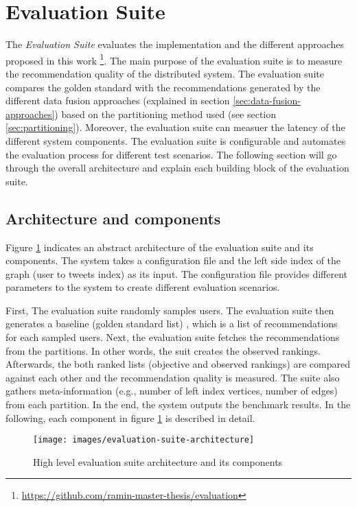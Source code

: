 \section{Evaluation Suite}
\label{sec:evaluation-suite}
The \emph{Evaluation Suite} evaluates the implementation and the different approaches proposed in this work \footnote{\url{https://github.com/ramin-master-thesis/evaluation}}. The main purpose of the evaluation suite is to measure the recommendation quality of the distributed system. The evaluation suite compares the golden standard with the recommendations generated by the different data fusion approaches (explained in section \ref{sec:data-fusion-approaches}) based on the partitioning method used (see section \ref{sec:partitioning}). Moreover, the evaluation suite can measuer the latency of the different system components. The evaluation suite is configurable and automates the evaluation process for different test scenarios. The following section will go through the overall architecture and explain each building block of the evaluation suite.


\subsection{Architecture and components}
\label{sec:eval-suite-architecture-components}
Figure \ref{fig:evaluation-suite-architecture} indicates an abstract architecture of the evaluation suite and its components. The system takes a configuration file and the left side index of the graph (user to tweets index) as its input. The configuration file provides different parameters to the system to create different evaluation scenarios. 


First, The evaluation suite randomly samples users. The evaluation suite then generates a baseline (golden standard list) , which is a list of recommendations for each sampled users. Next, the evaluation suite fetches the recommendations from the partitions. In other words, the suit creates the observed rankings. Afterwards, the both ranked lists (objective and observed rankings) are compared against each other and the recommendation quality is measured. The suite also gathers meta-information (e.g., number of left index vertices, number of edges) from each partition. In the end, the system outputs the benchmark results. In the following, each component in figure \ref{fig:evaluation-suite-architecture} is described in detail.


\begin{figure}[!h]
    \centering
    \texttt{[image: images/evaluation-suite-architecture]}
    \caption{High level evaluation suite architecture and its components}
    \label{fig:evaluation-suite-architecture}
\end{figure}


